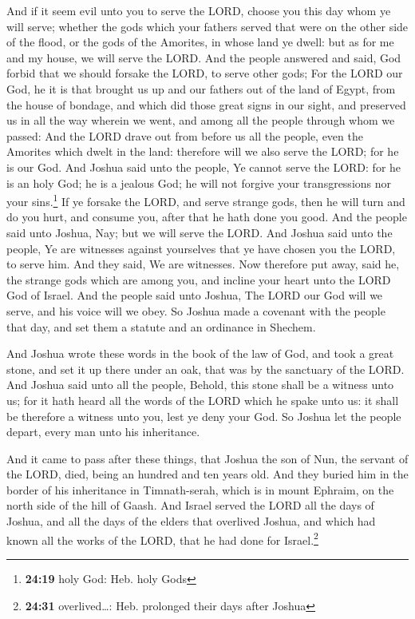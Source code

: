  And if it seem evil unto you to serve the LORD, choose
you this day whom ye will serve; whether the gods which your fathers
served that were on the other side of the flood, or the gods of the
Amorites, in whose land ye dwell: but as for me and my house, we will
serve the LORD.  And the people answered and said, God
forbid that we should forsake the LORD, to serve other gods;
 For the LORD our God, he it is that brought us up and
our fathers out of the land of Egypt, from the house of bondage, and
which did those great signs in our sight, and preserved us in all the
way wherein we went, and among all the people through whom we passed:
 And the LORD drave out from before us all the people,
even the Amorites which dwelt in the land: therefore will we also serve
the LORD; for he is our God.  And Joshua said unto the
people, Ye cannot serve the LORD: for he is an holy God; he is a jealous
God; he will not forgive your transgressions nor your sins.\footnote{\textbf{24:19}
  holy God: Heb. holy Gods}  If ye forsake the LORD, and
serve strange gods, then he will turn and do you hurt, and consume you,
after that he hath done you good.  And the people said
unto Joshua, Nay; but we will serve the LORD.  And Joshua
said unto the people, Ye are witnesses against yourselves that ye have
chosen you the LORD, to serve him. And they said, We are witnesses.
 Now therefore put away, said he, the strange gods which
are among you, and incline your heart unto the LORD God of Israel.
 And the people said unto Joshua, The LORD our God will
we serve, and his voice will we obey.  So Joshua made a
covenant with the people that day, and set them a statute and an
ordinance in Shechem.

 And Joshua wrote these words in the book of the law of
God, and took a great stone, and set it up there under an oak, that was
by the sanctuary of the LORD.  And Joshua said unto all
the people, Behold, this stone shall be a witness unto us; for it hath
heard all the words of the LORD which he spake unto us: it shall be
therefore a witness unto you, lest ye deny your God.  So
Joshua let the people depart, every man unto his inheritance.

 And it came to pass after these things, that Joshua the
son of Nun, the servant of the LORD, died, being an hundred and ten
years old.  And they buried him in the border of his
inheritance in Timnath-serah, which is in mount Ephraim, on the north
side of the hill of Gaash.  And Israel served the LORD
all the days of Joshua, and all the days of the elders that overlived
Joshua, and which had known all the works of the LORD, that he had done
for Israel.\footnote{\textbf{24:31} overlived\ldots: Heb. prolonged
  their days after Joshua}

